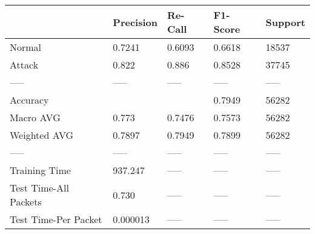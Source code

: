 \begin{tabular}{lllll}
\toprule
{} & Precision & Re-Call & F1-Score & Support \\
\midrule
Normal                &    0.7241 &  0.6093 &   0.6618 &   18537 \\
Attack                &     0.822 &   0.886 &   0.8528 &   37745 \\
-----                 &     ----- &   ----- &    ----- &   ----- \\
Accuracy              &           &         &   0.7949 &   56282 \\
Macro AVG             &     0.773 &  0.7476 &   0.7573 &   56282 \\
Weighted AVG          &    0.7897 &  0.7949 &   0.7899 &   56282 \\
-----                 &     ----- &   ----- &    ----- &   ----- \\
Training Time         &   937.247 &   ----- &    ----- &   ----- \\
Test Time-All Packets &     0.730 &   ----- &    ----- &   ----- \\
Test Time-Per Packet  &  0.000013 &   ----- &    ----- &   ----- \\
\bottomrule
\end{tabular}
